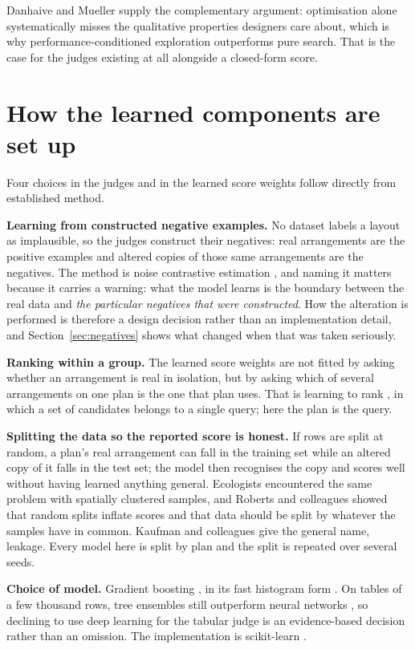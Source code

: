 Danhaive and Mueller \citep{danhaive2021subspace} supply the complementary
argument: optimisation alone systematically misses the qualitative
properties designers care about, which is why performance-conditioned
exploration outperforms pure search. That is the case for the judges
existing at all alongside a closed-form score.

\section{How the learned components are set up}

Four choices in the judges and in the learned score weights follow
directly from established method.

\textbf{Learning from constructed negative examples.} No dataset labels a
layout as implausible, so the judges construct their negatives: real
arrangements are the positive examples and altered copies of those same
arrangements are the negatives. The method is noise contrastive estimation
\citep{gutmann2010nce}, and naming it matters because it carries a
warning: what the model learns is the boundary between the real data and
\emph{the particular negatives that were constructed}. How the alteration
is performed is therefore a design decision rather than an implementation
detail, and Section~\ref{sec:negatives} shows what changed when that was
taken seriously.

\textbf{Ranking within a group.} The learned score weights are not fitted
by asking whether an arrangement is real in isolation, but by asking which
of several arrangements on one plan is the one that plan uses. That is
learning to rank \citep{liu2009ltr}, in which a set of candidates belongs
to a single query; here the plan is the query.

\textbf{Splitting the data so the reported score is honest.} If rows are
split at random, a plan's real arrangement can fall in the training set
while an altered copy of it falls in the test set; the model then
recognises the copy and scores well without having learned anything
general. Ecologists encountered the same problem with spatially clustered
samples, and Roberts and colleagues \citep{roberts2017cv} showed that
random splits inflate scores and that data should be split by whatever the
samples have in common. Kaufman and colleagues \citep{kaufman2012leakage}
give the general name, leakage. Every model here is split by plan and the
split is repeated over several seeds.

\textbf{Choice of model.} Gradient boosting \citep{friedman2001gbm}, in
its fast histogram form \citep{ke2017lightgbm}. On tables of a few
thousand rows, tree ensembles still outperform neural networks
\citep{grinsztajn2022tabular}, so declining to use deep learning for the
tabular judge is an evidence-based decision rather than an omission. The
implementation is scikit-learn \citep{pedregosa2011sklearn}.

